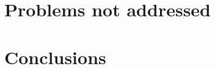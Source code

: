 \documentclass[11pt,a4paper]{article}
\begin{document}

\section{Problems not addressed}
\label{sec:probl-not-addr}





\section{Conclusions}
\label{sec:conclusions}





\end{document}
